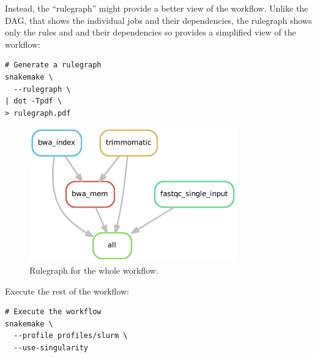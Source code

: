 Instead, the ``rulegraph'' might provide a better view of the workflow. Unlike the DAG, that shows the individual jobs and their
dependencies, the rulegraph shows only the rules and and their dependencies so provides a simplified view of the workflow:

\begin{lstlisting}
# Generate a rulegraph
snakemake \
  --rulegraph \
| dot -Tpdf \
> rulegraph.pdf
\end{lstlisting}

\begin{figure}[H]
\centering
\includegraphics[width=0.8\textwidth]{handout/rulegraph.pdf}
\caption{Rulegraph for the whole workflow.}
\label{fig:rulegraph}
\end{figure}

Execute the rest of the workflow:

\begin{lstlisting}
# Execute the workflow
snakemake \
  --profile profiles/slurm \
  --use-singularity
\end{lstlisting}

